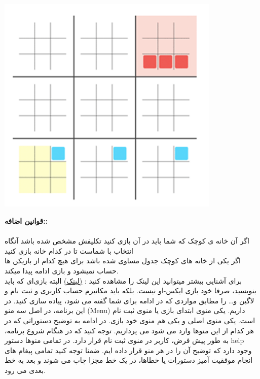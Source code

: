 \documentclass[]{article}
\begin{document}
\begin{center}
	\includegraphics[width=0.8\textwidth ]{cezar3.png}
\end{center}


\textbf{قوانین اضافه::}
\\\\اگر آن خانه ی کوچک که شما باید در آن بازی کنید تکلیفش  مشخص شده باشد آنگاه انتخاب با شماست تا در کدام خانه بازی کنید\\
اگر یکی از خانه های کوچک جدول مساوی شده باشد برای هیچ کدام از بازیکن ها حساب نمیشود و بازی ادامه پیدا میکند.\\
برای آشنایی بیشتر میتوانید این لینک را مشاهده کنید :
 \href{http://bejofo.net/ttt}{(لینک)}
\newpage
البته بازی‌ای که باید بنویسید، صرفا خود بازی ایکس-او نیست. بلکه باید مکانیزم حساب کاربری و ثبت نام و لاگین و… را مطابق مواردی که در ادامه برای شما گفته می شود، پیاده سازی کنید.
در این برنامه، در اصل سه منو (Menu) داریم. یکی منوی ابتدای بازی یا منوی ثبت نام است. یکی منوی اصلی و یکی هم منوی خود بازی. در ادامه به توضیح دستوراتی که در هر کدام از این منوها وارد می شود می پردازیم. توجه کنید که در هنگام شروع برنامه، به طور پیش فرض، کاربر در منوی ثبت نام قرار دارد. در تمامی منوها دستور help وجود دارد که توضیح آن را در هر منو قرار داده ایم. ضمنا توجه کنید تمامی پیغام های انجام موفقیت آمیز دستورات یا خطاها، در یک خط مجزا چاپ می شوند و بعد به خط بعدی می رود.


\hrulefill
\end{document}
